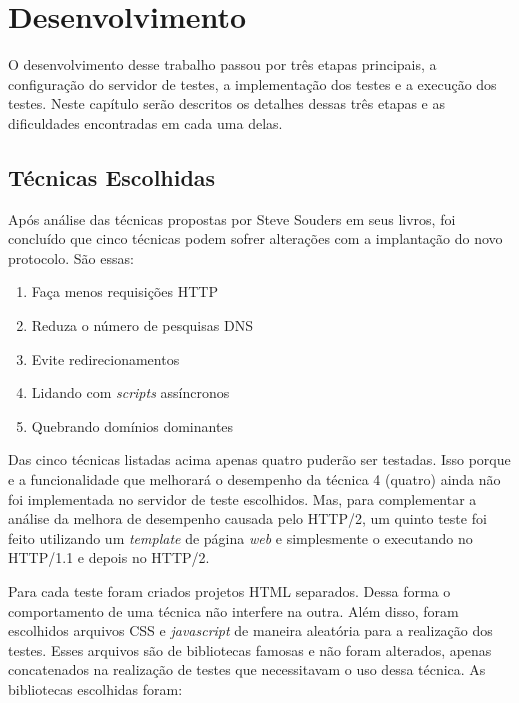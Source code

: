 %
%

\chapter{Desenvolvimento}

O desenvolvimento desse trabalho passou por três etapas principais, a configuração do servidor de testes, a implementação dos testes e a execução dos testes. Neste capítulo serão descritos os detalhes dessas três etapas e as dificuldades encontradas em cada uma delas.

\section{Técnicas Escolhidas}
\label{tecnicasescolhidas}

Após análise das técnicas propostas por Steve Souders em seus livros, foi concluído que cinco técnicas podem sofrer alterações com a implantação do novo protocolo. São essas:

\begin{enumerate}
	\item Faça menos requisições HTTP
	\item Reduza o número de pesquisas DNS
	\item Evite redirecionamentos
	\item Lidando com \textit{scripts} assíncronos
	\item Quebrando domínios dominantes
\end{enumerate}

Das cinco técnicas listadas acima apenas quatro puderão ser testadas. Isso porque e a funcionalidade que melhorará o desempenho da técnica 4 (quatro) ainda não foi implementada no servidor de teste escolhidos. Mas, para complementar a análise da melhora de desempenho causada pelo HTTP/2, um quinto teste foi feito utilizando um \textit{template} de página \textit{web} e simplesmente o executando no HTTP/1.1 e depois no HTTP/2.

Para cada teste foram criados projetos HTML separados. Dessa forma o comportamento de uma técnica não interfere na outra. Além disso, foram escolhidos arquivos CSS e \textit{javascript} de maneira aleatória para a realização dos testes. Esses arquivos são de bibliotecas famosas e não foram alterados, apenas concatenados na realização de testes que necessitavam o uso dessa técnica. As bibliotecas escolhidas foram:

